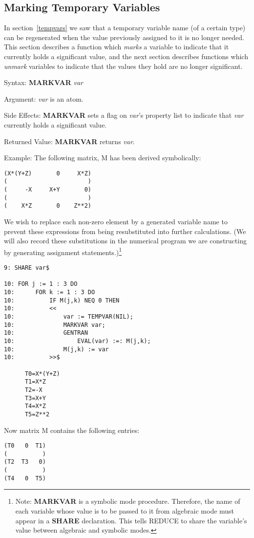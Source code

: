 \subsection{Marking Temporary Variables}
In section~\ref{tempvars} we saw that a temporary variable name (of a certain
type) can be regenerated when the value previously assigned to it
is no longer needed.  This section describes a function which {\it marks}
a variable to indicate that it currently holds a
significant value, and the next section describes functions which
{\it unmark} variables to indicate that the values they hold are no
longer significant.
\begin{describe}{Syntax:}
{\bf MARKVAR} {\it  var}
\end{describe}
\begin{describe}{Argument:}
{\it var} is an atom.
\end{describe}
\begin{describe}{Side Effects:}
{\bf MARKVAR} sets a flag on {\it var}'s property list to indicate that
{\it var} currently holds a significant value.
\end{describe}
\begin{describe}{Returned Value:}
{\bf MARKVAR} returns {\it var}.
\end{describe}
\begin{describe}{Example:}
The following matrix, M has been derived symbolically:
\begin{verbatim}
(X*(Y+Z)       0     X*Z)
(                       )
(     -X     X+Y       0)
(                       )
(    X*Z       0    Z**2)
\end{verbatim}
We wish to replace each non-zero element by a generated variable
name to prevent these expressions from being resubstituted into further
calculations.  (We will also record these substitutions in the
numerical program we are constructing by generating assignment
statements.)\footnote{ Note:  {\bf MARKVAR} is a symbolic mode procedure.
Therefore, the
name of each variable whose value is to be passed to it from algebraic mode must
appear in a {\bf SHARE} declaration.  This tells REDUCE to share the variable's
value between algebraic and symbolic modes.}
\begin{verbatim}
9: SHARE var$ 

10: FOR j := 1 : 3 DO 
10:      FOR k := 1 : 3 DO 
10:          IF M(j,k) NEQ 0 THEN 
10:          << 
10:              var := TEMPVAR(NIL); 
10:              MARKVAR var;
10:              GENTRAN
10:                  EVAL(var) :=: M(j,k);
10:              M(j,k) := var
10:          >>$ 

      T0=X*(Y+Z)
      T1=X*Z
      T2=-X
      T3=X+Y
      T4=X*Z
      T5=Z**2
\end{verbatim}
Now matrix M contains the following entries:
\begin{verbatim}
(T0   0  T1)
(          )
(T2  T3   0)
(          )
(T4   0  T5)
\end{verbatim}
\end{describe}

